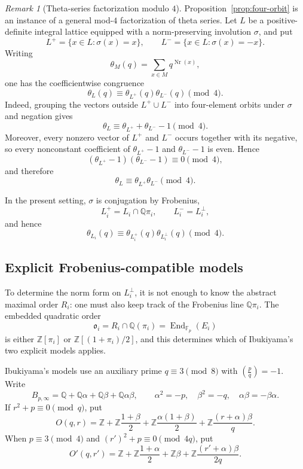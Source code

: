 \documentclass[11pt]{amsart}
\theoremstyle{definition}
\theoremstyle{remark}
\newtheorem{remark}[theorem]{Remark}
\newcommand{\Q}{\mathbb{Q}}
\newcommand{\Z}{\mathbb{Z}}
\newcommand{\F}{\mathbb{F}}
\newcommand{\End}{\operatorname{End}}
\newcommand{\Nr}{\operatorname{Nr}}
\newcommand{\leg}[2]{\left(\frac{#1}{#2}\right)}
\begin{document}
\begin{remark}[Theta-series factorization modulo $4$]
Proposition~\ref{prop:four-orbit} is an instance of a general mod-$4$
factorization of theta series. Let $L$ be a positive-definite integral
lattice equipped with a norm-preserving involution $\sigma$, and put
\[
  L^{+}=\{x\in L:\sigma(x)=x\},
  \qquad
  L^{-}=\{x\in L:\sigma(x)=-x\}.
\]
Writing
\[
  \theta_M(q)=\sum_{x\in M}q^{\Nr(x)},
\]
one has the coefficientwise congruence
\[
  \theta_L(q)\equiv
  \theta_{L^{+}}(q)\theta_{L^{-}}(q)
  \pmod4.
\]
Indeed, grouping the vectors outside $L^{+}\cup L^{-}$ into
four-element orbits under $\sigma$ and negation gives
\[
  \theta_L\equiv\theta_{L^{+}}+\theta_{L^{-}}-1\pmod4.
\]
Moreover, every nonzero vector of $L^{+}$ and $L^{-}$ occurs together
with its negative, so every nonconstant coefficient of
$\theta_{L^{+}}-1$ and $\theta_{L^{-}}-1$ is even. Hence
\[
  (\theta_{L^{+}}-1)(\theta_{L^{-}}-1)\equiv0\pmod4,
\]
and therefore
\[
  \theta_L\equiv\theta_{L^{+}}\theta_{L^{-}}\pmod4.
\]

In the present setting, $\sigma$ is conjugation by Frobenius,
\[
  L_i^{+}=L_i\cap\Q\pi_i,
  \qquad
  L_i^{-}=L_i^\perp,
\]
and hence
\[
  \theta_{L_i}(q)\equiv
  \theta_{L_i^{+}}(q)\theta_{L_i^\perp}(q)
  \pmod4.
\]
\end{remark}

\subsection{Explicit Frobenius-compatible models}

To determine the norm form on $L_i^\perp$, it is not enough to know the
abstract maximal order $R_i$: one must also keep track of the Frobenius
line $\Q\pi_i$. The embedded quadratic order
\[
  \mathfrak o_i
  =R_i\cap\Q(\pi_i)
  =\End_{\F_p}(E_i)
\]
is either $\Z[\pi_i]$ or $\Z[(1+\pi_i)/2]$, and this determines which of
Ibukiyama's two explicit models applies.


Ibukiyama's models use an auxiliary prime $q\equiv3\pmod8$ with $\leg{p}{q}=-1$.  Write
\[
 B_{p,\infty}=\Q+\Q\alpha+\Q\beta+\Q\alpha\beta,
 \qquad
 \alpha^2=-p,\quad \beta^2=-q,\quad \alpha\beta=-\beta\alpha.
\]
If $r^2+p\equiv0\pmod q$, put
\[
 O(q,r)=\Z+\Z\frac{1+\beta}{2}
       +\Z\frac{\alpha(1+\beta)}2
       +\Z\frac{(r+\alpha)\beta}{q}.
\]
When $p\equiv3\pmod4$ and $(r')^2+p\equiv0\pmod{4q}$, put
\[
 O'(q,r')=\Z+\Z\frac{1+\alpha}{2}
       +\Z\beta
       +\Z\frac{(r'+\alpha)\beta}{2q}.
\]
\end{document}
